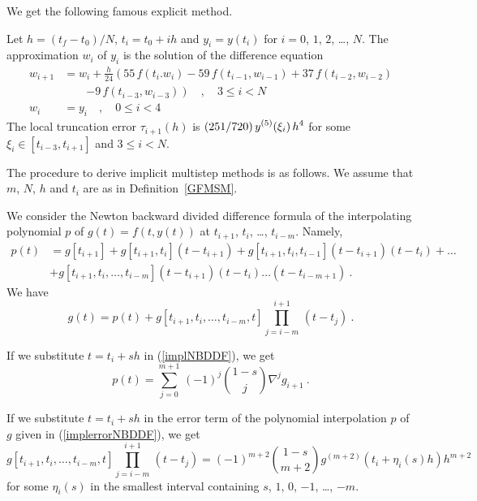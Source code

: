 We get the following famous explicit method.

\begin{defn}
Let $h=(t_f-t_0)/N$, $t_i=t_0+ih$ and $y_i = y(t_i)$ for $i=0$,
$1$, $2$, \ldots, $N$.  The approximation $w_i$ of $y_i$ is the
solution of the difference equation
\begin{align*}
w_{i+1} & = w_i + \frac{h}{24} \left( 55 \, f(t_i.w_i) - 59 \,
f(t_{i-1},w_{i-1}) + 37\, f(t_{i-2},w_{i-2}) \right. \\
&\qquad \left. - 9 \,f(t_{i-3},w_{i-3}) \right)
\quad, \quad 3 \leq i < N \\
w_i & =y_i \quad, \quad 0\leq i < 4
\end{align*}
The local truncation error $\tau_{i+1}(h)$ is
$\displaystyle (251/720)\,y^{(5)}(\xi_i)\,h^4$ for some
$\xi_i \in [t_{i-3},t_{i+1}]$ and $3 \leq i < N$.
\label{ABFSM}
\end{defn}

The procedure to derive implicit multistep methods is as
follows.  We assume that $m$, $N$, $h$ and $t_i$ are as in
Definition~\ref{GFMSM}.

We consider the Newton backward divided difference formula of the
interpolating polynomial $p$ of $g(t) = f(t,y(t))$ at $t_{i+1}$,
$t_i$, \ldots, $t_{i-m}$.  Namely,
\begin{equation} \label{implNBDDF}
\begin{split}
p(t) & = g[t_{i+1}] + g[t_{i+1},t_i](t-t_{i+1}) +
g[t_{i+1},t_i,t_{i-1}](t-t_{i+1})(t-t_i) + \ldots \\
 &+ g[t_{i+1},t_i,\ldots,t_{i-m}](t-t_{i+1})(t-t_i)\ldots(t-t_{i-m+1}) \ .
\end{split}
\end{equation}
We have
\begin{equation} \label{implerrorNBDDF}
g(t) = p(t) +
g[t_{i+1},t_i,\ldots,t_{i-m},t]\prod_{j=i-m}^{i+1}\,(t-t_j) \ .
\end{equation}

If we substitute $t=t_i + sh$ in (\ref{implNBDDF}), we get
\[
p(t) = \sum_{j=0}^{m+1}\,(-1)^j \binom{1-s}{j}\nabla^j g_{i+1} \ .
\]

If we substitute $t=t_i + sh$ in the error term of the polynomial
interpolation $p$ of $g$ given in (\ref{implerrorNBDDF}), we get
\[
g[t_{i+1},t_i,\ldots,t_{i-m},t]\prod_{j=i-m}^{i+1}\,(t-t_j) =
(-1)^{m+2} \binom{1-s}{m+2} g^{(m+2)}(t_i+\eta_i(s)h) h^{m+2}
\]
for some $\eta_i(s)$ in the smallest interval containing
$s$, $1$, $0$, $-1$, \ldots, $-m$.

